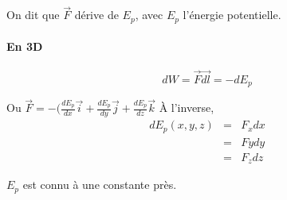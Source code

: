 	On dit que $\vec{F}$ dérive de $E_p$, avec $E_p$ l'énergie potentielle.

\paragraph{En 3D} \[dW = \vec{F}\vec{dl} = -dE_p\]

Ou $\vec{F} = -(\frac{dE_p}{dx}\vec{i} + \frac{dE_p}{dy}\vec{j} + \frac{dE_p}{dz}\vec{k}$
À l'inverse, \[\begin{array}{rcl}
		dE_p(x, y, z) &=& F_xdx \\
							   &=& Fy dy \\
					  &=& F_z dz
\end{array}\]

$E_p$ est connu à une constante près.
